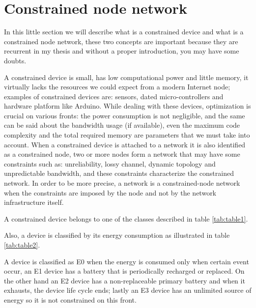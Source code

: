 	\section{Constrained node network}
	In this little section we will describe what is a constrained device and what is a constrained node network,
	these two concepts are important because they are recurrent in my thesis and without a proper introduction, you may have
	some doubts. \newline
	
	A constrained device is small, has low computational power and little memory, it virtually lacks the resources
	we could expect from a modern Internet node; examples of constrained devices are: sensors, dated micro-controllers and hardware platform like Arduino.\newline
	While dealing with these devices, optimization is crucial on various fronts: the power consumption is not negligible,
	and the same can be said about the bandwidth usage (if available), even the maximum code complexity and the total required memory are parameters that we must take into account.\newline
	When a constrained device is attached to a network it is also identified as a constrained node, two or more nodes form a network that may have some constraints such as: unreliability, lossy channel, dynamic topology and unpredictable bandwidth, and these constraints characterize the constrained network.\newline
	In order to be more precise, a network is a constrained-node network when the constraints are imposed by the node
	and not by the network infrastructure itself.
	
	
	
	A constrained device belongs to one of the classes described in table \ref{tab:table1}.\newline
	
	
	Also, a device is classified by its energy consumption as illustrated in table \ref{tab:table2}.
	
	A device is classified as E0 when the energy is consumed only when certain event occur, an E1 device has a battery 
	that is periodically recharged or replaced.\newline
	On the other hand an E2 device has a non-replaceable primary battery and when it exhausts, the device life cycle ends; lastly an E3 device has an unlimited source of energy so it is not constrained on this front.\newline 
	
